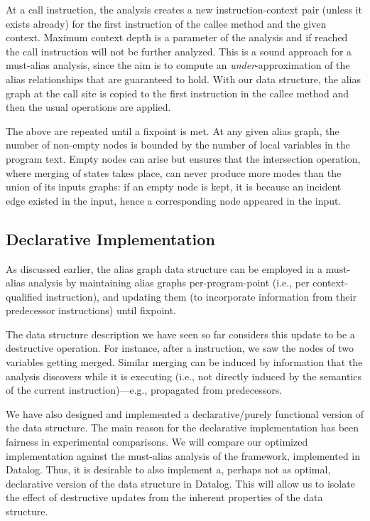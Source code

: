 At a call instruction, the analysis creates a new instruction-context pair (unless it exists already) for the first instruction of the callee method and the given context. Maximum context depth is a parameter of the analysis and if reached the call instruction will not be further analyzed. This is a sound approach for a must-alias analysis, since the aim is to compute an \emph{under}-approximation of the alias relationships that are guaranteed to hold. With our data structure, the alias graph at the call site is copied to the first instruction in the callee method and then the usual operations are applied.

The above are repeated until a fixpoint is met. At any given alias graph, the number of non-empty nodes is bounded by the number of local variables in the program text. Empty nodes can arise but  ensures that the intersection operation, where merging of states takes place, can never produce more modes than the union of its inputs graphs: if an empty node is kept, it is because an incident edge existed in the input, hence a corresponding node appeared in the input.


\subsection{Declarative Implementation}

As discussed earlier, the alias graph data structure can be employed in a must-alias analysis by maintaining alias graphs per-program-point (i.e., per context-qualified instruction), and updating them (to incorporate information from their predecessor instructions) until fixpoint.

The data structure description we have seen so far considers this update to be a destructive operation. For instance, after a  instruction, we saw the nodes of two variables getting merged. Similar merging can be induced by information that the analysis discovers while it is executing (i.e., not directly induced by the semantics of the current instruction)---e.g., propagated from predecessors.

We have also designed and implemented a declarative/purely functional version of the data structure. The main reason for the declarative implementation has been fairness in experimental comparisons. We will compare our optimized implementation against the must-alias analysis of the \doop{} framework, implemented in Datalog. Thus, it is desirable to also implement a, perhaps not as optimal, declarative version of the data structure in Datalog. This will allow us to isolate the effect of destructive updates from the inherent properties of the data structure.

